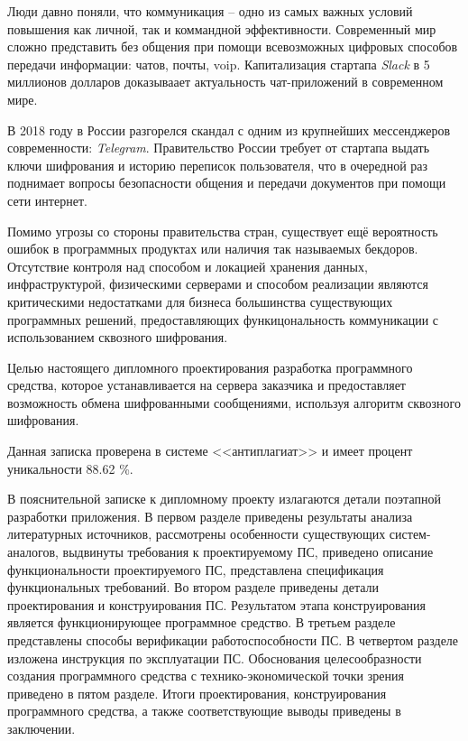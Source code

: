 
Люди давно поняли, что коммуникация -- одно из самых важных условий повышения как личной, так и коммандной эффективности. Современный мир сложно представить без общения при помощи всевозможных цифровых способов передачи информации: чатов, почты, \gls{voip}. Капитализация стартапа \textit{Slack} в 5 миллионов долларов\cite{slack:capitalization} доказываает актуальность чат-приложений в современном мире.

В 2018 году в России разгорелся скандал с одним из крупнейших мессенджеров современности: \textit{Telegram}. Правительство России требует от стартапа выдать ключи шифрования и историю переписок пользователя, что в очередной раз поднимает вопросы безопасности общения и передачи документов при помощи сети интернет\cite{telegram:vs:rkn}.

Помимо угрозы со стороны правительства стран, существует ещё вероятность ошибок в программных продуктах или наличия так называемых бекдоров. Отсутствие контроля над способом и локацией хранения данных, инфраструктурой, физическими серверами и способом реализации являются критическими недостатками для бизнеса большинства существующих программных решений, предоставляющих функицональность коммуникации с использованием сквозного шифрования.

Целью настоящего дипломного проектирования разработка программного средства, которое устанавливается на сервера заказчика и предоставляет возможность обмена шифрованными сообщениями, используя алгоритм сквозного шифрования.

Данная записка проверена в системе <<антиплагиат>> и имеет процент уникальности 88.62 \%.

В пояснительной записке к дипломному проекту излагаются детали поэтапной разработки приложения. В первом разделе приведены результаты анализа литературных источников, рассмотрены особенности существующих систем-аналогов, выдвинуты требования к проектируемому ПС, приведено описание функциональности проектируемого ПС, представлена спецификация функциональных требований. Во втором разделе приведены детали проектирования и конструирования ПС. Результатом этапа конструирования является функционирующее программное средство. В третьем разделе представлены способы верификации работоспособности ПС. В четвертом разделе изложена инструкция по эксплуатации ПС. Обоснования целесообразности создания программного средства с технико-экономической точки зрения приведено в пятом разделе. Итоги проектирования, конструирования программного средства, а также соответствующие выводы приведены в заключении.